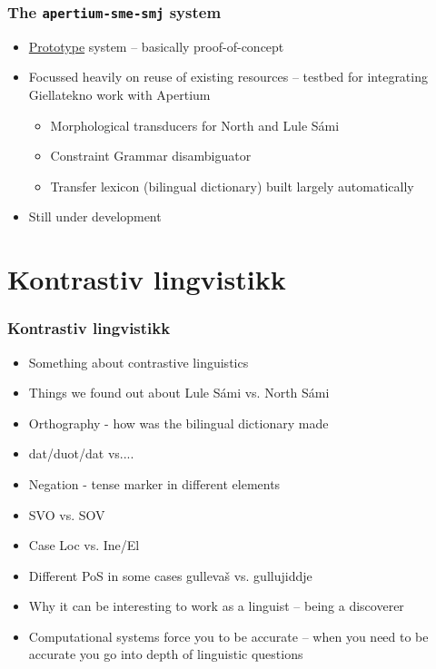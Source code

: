 \documentclass{beamer}
\begin{document}
\begin{frame}
\frametitle{The {\tt apertium-sme-smj} system}

\begin{itemize}
  \item \underline{Prototype} system -- basically proof-of-concept
  \item Focussed heavily on reuse of existing resources -- testbed for 
    integrating Giellatekno work with Apertium
  \begin{itemize}
    \item Morphological transducers for North and Lule Sámi
    \item Constraint Grammar disambiguator
    \item Transfer lexicon (bilingual dictionary) built largely automatically
  \end{itemize}
  \item Still under development
\end{itemize}

\end{frame}



\section{Kontrastiv lingvistikk} 
\begin{frame}\frametitle{Kontrastiv lingvistikk}
\begin{itemize}
\item Something about contrastive linguistics \pause
\item Things we found out about Lule Sámi vs. North Sámi \pause
\item Orthography - how was the bilingual dictionary made \pause
\item dat/duot/dat vs....\pause
\item Negation - tense marker in different elements \pause
\item SVO vs. SOV \pause
\item Case Loc vs. Ine/El \pause
\item Different PoS in some cases gullevaš vs. gullujiddje \pause
\item Why it can be interesting to work as a linguist -- being a discoverer \pause
\item Computational systems force you to be accurate -- when you need to be accurate you go into depth of linguistic questions
\end{itemize} 
\end{frame}
\end{document}
